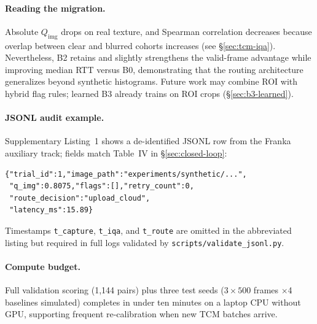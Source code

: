 \begin{table}[t]
\centering
\caption{Evolution from synthetic phase-2 to ShezhenV3 full validation.}
\label{tab:synthetic-vs-tcm}
\small
{}
\end{table}

\paragraph{Reading the migration.}
Absolute $Q_{\mathrm{img}}$ drops on real texture, and Spearman correlation decreases because overlap between clear and blurred cohorts increases (see \S\ref{sec:tcm-iqa}).
Nevertheless, B2 retains and slightly strengthens the valid-frame advantage while improving median RTT versus B0, demonstrating that the routing architecture generalizes beyond synthetic histograms.
Future work may combine ROI with hybrid flag rules; learned B3 already trains on ROI crops (\S\ref{sec:b3-learned}).

\paragraph{JSONL audit example.}
Supplementary Listing~1 shows a de-identified JSONL row from the Franka auxiliary track; fields match Table~IV in \S\ref{sec:closed-loop}:
\begin{verbatim}
{"trial_id":1,"image_path":"experiments/synthetic/...",
 "q_img":0.8075,"flags":[],"retry_count":0,
 "route_decision":"upload_cloud",
 "latency_ms":15.89}
\end{verbatim}
Timestamps \texttt{t\_capture}, \texttt{t\_iqa}, and \texttt{t\_route} are omitted in the abbreviated listing but required in full logs validated by \texttt{scripts/validate\_jsonl.py}.

\paragraph{Compute budget.}
Full validation scoring (1{,}144 pairs) plus three test seeds ($3\times500$ frames $\times$4 baselines simulated) completes in under ten minutes on a laptop CPU without GPU, supporting frequent re-calibration when new TCM batches arrive.
